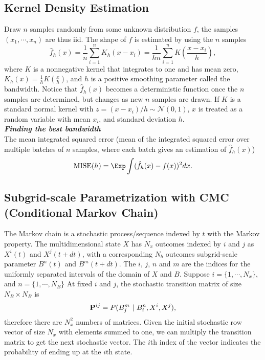 \subsection{Kernel Density Estimation}
Draw $n$ samples randomly from some unknown distribution $f$, the samples $(x_1,\cdots,x_n)$ are thus iid. 
The shape of $f$ is estimated by using the $n$ samples
\begin{equation}
   \hat{f}_h(x) = \frac{1}{n} \sum_{i=1}^n K_h(x-x_i) = \frac{1}{hn} \sum_{i=1}^n K(\frac{x-x_i}{h}),
\end{equation}
where $K$ is a nonnegative kernel that integrates to one and has mean zero, $K_h(x) = \frac{1}{h}K(\frac{x}{h})$, and $h$ is a positive smoothing parameter called the bandwidth.
Notice that $\hat{f}_h(x)$ becomes a deterministic function once the $n$ samples are determined, but changes as new $n$ samples are drawn.
If $K$ is a standard normal kernel with $z = (x-x_i)/h \sim \mathcal{N}(0,1)$, $x$ is treated as a random variable with mean $x_i$, and standard deviation $h$. \\


{\bf\emph{Finding the best bandwidth}} \\
The mean integrated squared error (mean of the integrated squared error over multiple batches of $n$ samples, where each batch gives an estimation of $\hat{f}_h(x)$)
\begin{equation}
   \text{MISE}(h) = \Exp\int(\hat{f}_h(x) - f(x))^2 dx.
\end{equation}




\subsection{Subgrid-scale Parametrization with CMC (Conditional Markov Chain)}
The Markov chain is a stochastic process/sequence indexed by $t$ with the Markov property.
The multidimensional state $X$ has $N_x$ outcomes indexed by $i$ and $j$ as $X^i(t)$ and $X^j(t+dt)$, with a corresponding $N_b$ outcomes subgrid-scale parameter $B^n(t)$ and $B^m(t+dt)$.
The $i$, $j$, $n$ and $m$ are the indices for the uniformly separated intervals of the domain of $X$ and $B$.
Suppose $i = \{ 1, \cdots, N_x \}$, and $n = \{ 1, \cdots, N_B \}$
At fixed $i$ and $j$, the stochastic transition matrix of size $N_B \times N_B$ is 
\begin{equation}
  {\bf P}^{ij} = P(B_j^m \ | \ B_i^n, X^i, X^j ),
\end{equation}
therefore there are $N_x^2$ numbers of matrices.
Given the initial stochastic row vector of size $N_x$ with elements summed to one, we can multiply the transition matrix to get the next stochastic vector.
The $i$th index of the vector indicates the probability of ending up at the $i$th state. \\

